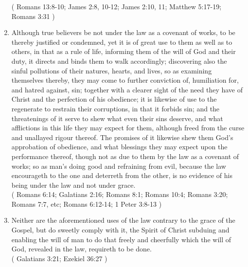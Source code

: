 \documentclass[12pt,a4paper]{book}
\begin{document}
\begin{enumerate}
( Romans 13:8-10; James 2:8, 10-12; James 2:10, 11; Matthew 5:17-19; Romans 3:31 )
\item Although true believers be not under the law as a covenant of works, to be thereby justified or condemned, yet it is of great use to them as well as to others, in that as a rule of life, informing them of the will of God and their duty, it directs and binds them to walk accordingly; discovering also the sinful pollutions of their natures, hearts, and lives, so as examining themselves thereby, they may come to further conviction of, humiliation for, and hatred against, sin; together with a clearer sight of the need they have of Christ and the perfection of his obedience; it is likewise of use to the regenerate to restrain their corruptions, in that it forbids sin; and the threatenings of it serve to shew what even their sins deserve, and what afflictions in this life they may expect for them, although freed from the curse and unallayed rigour thereof. The promises of it likewise shew them God's approbation of obedience, and what blessings they may expect upon the performance thereof, though not as due to them by the law as a covenant of works; so as man's doing good and refraining from evil, because the law encourageth to the one and deterreth from the other, is no evidence of his being under the law and not under grace.\\
( Romans 6:14; Galatians 2:16; Romans 8:1; Romans 10:4; Romans 3:20; Romans 7:7, etc; Romans 6:12-14; 1 Peter 3:8-13 )
\item Neither are the aforementioned uses of the law contrary to the grace of the Gospel, but do sweetly comply with it, the Spirit of Christ subduing and enabling the will of man to do that freely and cheerfully which the will of God, revealed in the law, requireth to be done.\\
( Galatians 3:21; Ezekiel 36:27 )
\end{enumerate}
\end{document}
